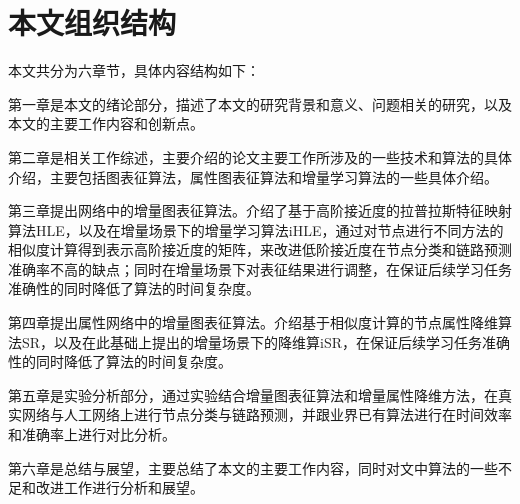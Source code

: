 \section{本文组织结构}

本文共分为六章节，具体内容结构如下：

第一章是本文的绪论部分，描述了本文的研究背景和意义、问题相关的研究，以及本文的主要工作内容和创新点。

第二章是相关工作综述，主要介绍的论文主要工作所涉及的一些技术和算法的具体介绍，主要包括图表征算法，属性图表征算法和增量学习算法的一些具体介绍。

第三章提出网络中的增量图表征算法。介绍了基于高阶接近度的拉普拉斯特征映射算法HLE，以及在增量场景下的增量学习算法iHLE，通过对节点进行不同方法的相似度计算得到表示高阶接近度的矩阵，来改进低阶接近度在节点分类和链路预测准确率不高的缺点；同时在增量场景下对表征结果进行调整，在保证后续学习任务准确性的同时降低了算法的时间复杂度。

第四章提出属性网络中的增量图表征算法。介绍基于相似度计算的节点属性降维算法SR，以及在此基础上提出的增量场景下的降维算iSR，在保证后续学习任务准确性的同时降低了算法的时间复杂度。

第五章是实验分析部分，通过实验结合增量图表征算法和增量属性降维方法，在真实网络与人工网络上进行节点分类与链路预测，并跟业界已有算法进行在时间效率和准确率上进行对比分析。

第六章是总结与展望，主要总结了本文的主要工作内容，同时对文中算法的一些不足和改进工作进行分析和展望。
